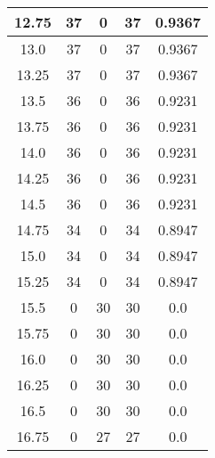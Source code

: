 \documentclass[letterpaper, 12pt]{article}
\begin{document}
\begin{longtable}{|c|c|c|c|c|}
\hline
12.75 & 37 & 0 & 37 & 0.9367 \\
\hline
13.0 & 37 & 0 & 37 & 0.9367 \\
\hline
13.25 & 37 & 0 & 37 & 0.9367 \\
\hline
13.5 & 36 & 0 & 36 & 0.9231 \\
\hline
13.75 & 36 & 0 & 36 & 0.9231 \\
\hline
14.0 & 36 & 0 & 36 & 0.9231 \\
\hline
14.25 & 36 & 0 & 36 & 0.9231 \\
\hline
14.5 & 36 & 0 & 36 & 0.9231 \\
\hline
14.75 & 34 & 0 & 34 & 0.8947 \\
\hline
15.0 & 34 & 0 & 34 & 0.8947 \\
\hline
15.25 & 34 & 0 & 34 & 0.8947 \\
\hline
15.5 & 0 & 30 & 30 & 0.0 \\
\hline
15.75 & 0 & 30 & 30 & 0.0 \\
\hline
16.0 & 0 & 30 & 30 & 0.0 \\
\hline
16.25 & 0 & 30 & 30 & 0.0 \\
\hline
16.5 & 0 & 30 & 30 & 0.0 \\
\hline
16.75 & 0 & 27 & 27 & 0.0 \\
\hline
\end{longtable}
\end{document}
